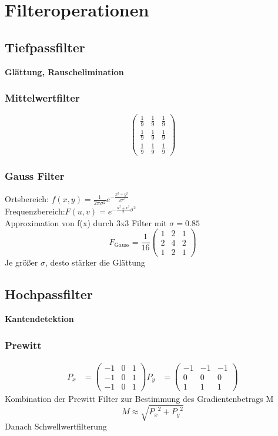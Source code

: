 \section{Filteroperationen}
\subsection{Tiefpassfilter}
\textbf{Glättung, Rauschelimination}
\subsubsection{Mittelwertfilter}
\begin{displaymath}
     \begin{pmatrix}
         \frac{1}{9} & \frac{1}{9} & \frac{1}{9} \\
         \frac{1}{9} & \frac{1}{9} & \frac{1}{9} \\
         \frac{1}{9} & \frac{1}{9} & \frac{1}{9}
     \end{pmatrix}
\end{displaymath}
\subsubsection{Gauss Filter}
Ortsbereich: $ f(x,y) = \frac{1}{2\pi\sigma^2}e^{-\frac{x^2+y^2}{2\sigma^2}}$\\
Frequenzbereich:$ F(u,v) = e^{-\frac{u^2+v^2}{2}\sigma^2} $\\
Approximation von f(x) durch 3x3 Filter mit $\sigma = 0.85$
\begin{displaymath}
     F_\text{Gauss} = \frac{1}{16} \begin{pmatrix}
         1 & 2 & 1 \\ 2&4&2\\1&2&1
 \end{pmatrix}
\end{displaymath}
Je größer $\sigma$, desto stärker die Glättung
\subsection{Hochpassfilter}
\textbf{Kantendetektion}

\subsubsection{Prewitt}
\begin{align}
    P_x &= \begin{pmatrix}-1&0&1\\-1&0&1\\-1&0&1 \end{pmatrix}
    P_y &= \begin{pmatrix}-1&-1&-1\\0&0&0\\1&1&1 \end{pmatrix}
\end{align}
Kombination der Prewitt Filter zur Bestimmung des Gradientenbetrags M
\begin{displaymath}
     M \approx \sqrt{{P_x}^2 + {P_y}^2}
\end{displaymath}
Danach Schwellwertfilterung

